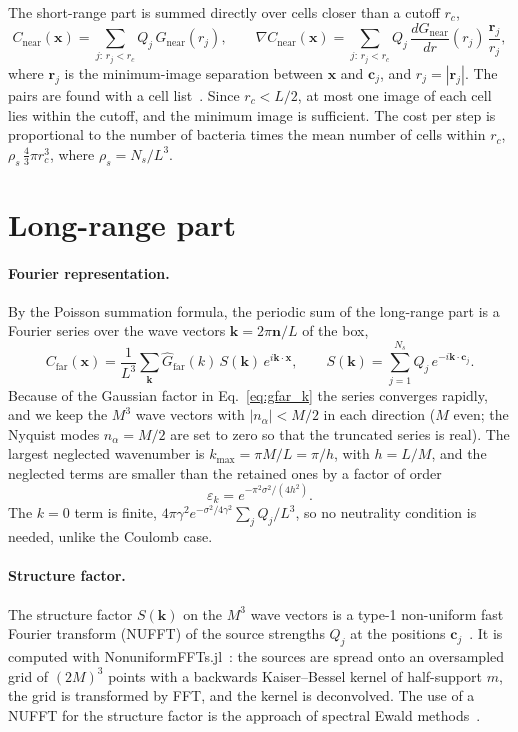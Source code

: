 \documentclass[11pt,a4paper]{article}
\newcommand{\vect}[1]{\mathbf{#1}}
\begin{document}
The short-range part is summed directly over cells closer than a cutoff $r_c$,
\begin{equation}
  C_{\mathrm{near}}(\vect{x}) = \sum_{j:\,r_j<r_c} Q_j\,G_{\mathrm{near}}(r_j), \qquad
  \nabla C_{\mathrm{near}}(\vect{x}) = \sum_{j:\,r_j<r_c} Q_j\,\frac{dG_{\mathrm{near}}}{dr}(r_j)\,\frac{\vect{r}_j}{r_j},
\end{equation}
where $\vect{r}_j$ is the minimum-image separation between $\vect{x}$ and $\vect{c}_j$, and
$r_j = |\vect{r}_j|$. The pairs are found with a cell list~\cite{CellListMap}. Since
$r_c < L/2$, at most one image of each cell lies within the cutoff, and the minimum image is
sufficient. The cost per step is proportional to the number of bacteria times the mean number of
cells within $r_c$, $\rho_s\,\tfrac{4}{3}\pi r_c^3$, where $\rho_s = N_s/L^3$.

\section{Long-range part}

\paragraph{Fourier representation.}
By the Poisson summation formula, the periodic sum of the long-range part is a Fourier series over
the wave vectors $\vect{k} = 2\pi\vect{n}/L$ of the box,
\begin{equation}
  C_{\mathrm{far}}(\vect{x}) = \frac{1}{L^3}\sum_{\vect{k}} \hat G_{\mathrm{far}}(k)\,S(\vect{k})\,e^{i\vect{k}\cdot\vect{x}},
  \qquad S(\vect{k}) = \sum_{j=1}^{N_s} Q_j\,e^{-i\vect{k}\cdot\vect{c}_j}.
  \label{eq:fourier}
\end{equation}
Because of the Gaussian factor in Eq.~\eqref{eq:gfar_k} the series converges rapidly, and we keep
the $M^3$ wave vectors with $|n_\alpha| < M/2$ in each direction ($M$ even; the Nyquist modes
$n_\alpha = M/2$ are set to zero so that the truncated series is real). The largest neglected
wavenumber is $k_{\max} = \pi M/L = \pi/h$, with $h = L/M$, and the neglected terms are smaller than
the retained ones by a factor of order
\begin{equation}
  \varepsilon_k = e^{-\pi^2\sigma^2/(4h^2)}.
  \label{eq:eps_k}
\end{equation}
The $k=0$ term is finite, $4\pi\gamma^2 e^{-\sigma^2/4\gamma^2} \sum_j Q_j/L^3$, so no
neutrality condition is needed, unlike the Coulomb case.

\paragraph{Structure factor.}
The structure factor $S(\vect{k})$ on the $M^3$ wave vectors is a type-1 non-uniform fast Fourier
transform (NUFFT) of the source strengths $Q_j$ at the positions $\vect{c}_j$~\cite{Barnett2019}.
It is computed with NonuniformFFTs.jl~\cite{NonuniformFFTs}: the sources are spread onto an oversampled grid
of $(2M)^3$ points with a backwards Kaiser--Bessel kernel of half-support $m$, the grid is
transformed by FFT, and the kernel is deconvolved. The use of a NUFFT for the structure factor is
the approach of spectral Ewald methods~\cite{LindboTornberg2011}.
\end{document}
